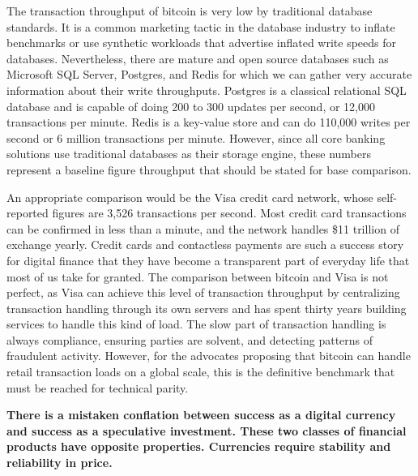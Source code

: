 The transaction throughput of bitcoin is very low by traditional
database standards. It is a common marketing tactic in the database industry to
inflate benchmarks or use synthetic workloads that advertise inflated write
speeds for databases. Nevertheless, there are mature and open source databases
such as Microsoft SQL Server, Postgres, and Redis for which we can gather very
accurate information about their write throughputs.  Postgres is a classical
relational SQL database and is capable of doing 200 to 300 updates per second,
or 12,000 transactions per minute. Redis is a key-value store and can do 110,000
writes per second or 6 million transactions per minute. However, since all core
banking solutions use traditional databases as their storage engine, these
numbers represent a baseline figure throughput that should be stated for base
comparison. \cite{katz_bitcoin_2017}


An appropriate comparison would be the Visa credit card network, whose
self-reported figures are 3,526 transactions per second. Most credit card
transactions can be confirmed in less than a minute, and the network handles
\$11 trillion of exchange yearly. Credit cards and contactless payments are such
a success story for digital finance that they have become a transparent part of
everyday life that most of us take for granted. The comparison between bitcoin
and Visa is not perfect, as Visa can achieve this level of transaction
throughput by centralizing transaction handling through its own servers and has
spent thirty years building services to handle this kind of load. The slow part
of transaction handling is always compliance, ensuring parties are solvent, and
detecting patterns of fraudulent activity. However, for the advocates proposing
that bitcoin can handle retail transaction loads on a global scale, this is the
definitive benchmark that must be reached for technical parity.


\begin{infobox}
 \textbf{
    There is a mistaken conflation between success as a digital currency and
    success as a speculative investment. These two classes of financial
    products have opposite properties. Currencies require stability and
    reliability in price.
  }
\end{infobox}


